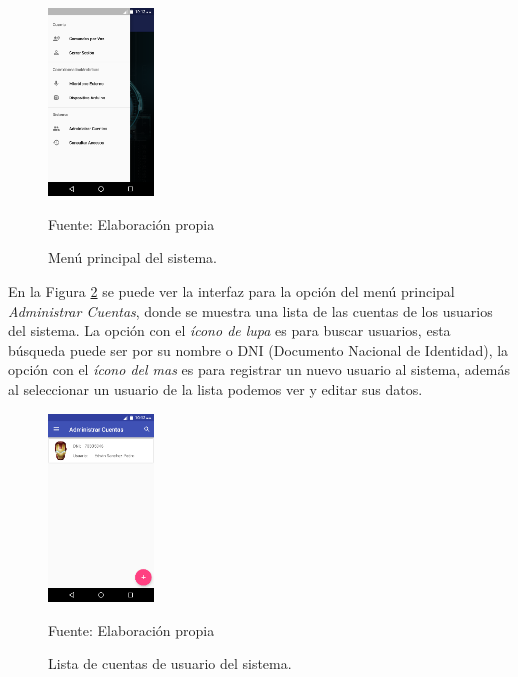 \begin{figure}[H]
\captionsetup{justification=centering}
\begin{center}
\includegraphics[width=0.25\textwidth]{Imagenes/Cap3/image039}
\end{center}
\begin{center}
\vskip -0.5cm
\caption{\small{Menú principal del sistema.}}
\label{fig:figura3.39}
{\small{Fuente: Elaboración propia}}
\end{center}
\end{figure}
\vskip -0.5cm
En la Figura \ref{fig:figura3.40} se puede ver la interfaz para la opción del menú principal \textit{Administrar Cuentas}, donde se muestra una lista de las cuentas de los usuarios del sistema. La opción con el \textit{ícono de lupa} es para buscar usuarios, esta búsqueda puede ser por su nombre o DNI (Documento Nacional de Identidad), la opción con el \textit{ícono del mas} es para registrar un nuevo usuario al sistema, además al seleccionar un usuario de la lista podemos ver y editar sus datos.
\begin{figure}[H]
\captionsetup{justification=centering}
\begin{center}
\includegraphics[width=0.25\textwidth]{Imagenes/Cap3/image040}
\end{center}
\begin{center}
\vskip -0.5cm
\caption{\small{Lista de cuentas de usuario del sistema.}}
\label{fig:figura3.40}
{\small{Fuente: Elaboración propia}}
\end{center}
\end{figure}
